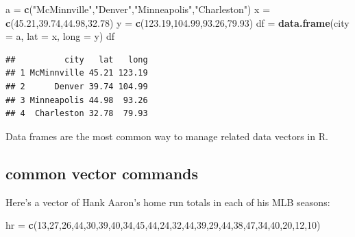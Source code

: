 \documentclass[
]{book}
\newenvironment{Shaded}{\begin{snugshade}}{\end{snugshade}}
\newcommand{\AttributeTok}[1]{\textcolor[rgb]{0.13,0.29,0.53}{#1}}
\newcommand{\DecValTok}[1]{\textcolor[rgb]{0.00,0.00,0.81}{#1}}
\newcommand{\FloatTok}[1]{\textcolor[rgb]{0.00,0.00,0.81}{#1}}
\newcommand{\FunctionTok}[1]{\textcolor[rgb]{0.13,0.29,0.53}{\textbf{#1}}}
\newcommand{\NormalTok}[1]{#1}
\newcommand{\OtherTok}[1]{\textcolor[rgb]{0.56,0.35,0.01}{#1}}
\newcommand{\StringTok}[1]{\textcolor[rgb]{0.31,0.60,0.02}{#1}}
\theoremstyle{definition}
\theoremstyle{definition}
\theoremstyle{definition}
\theoremstyle{definition}
\theoremstyle{remark}
\begin{document}
\begin{Shaded}
\begin{Highlighting}[]
\NormalTok{a }\OtherTok{=} \FunctionTok{c}\NormalTok{(}\StringTok{"McMinnville"}\NormalTok{,}\StringTok{"Denver"}\NormalTok{,}\StringTok{"Minneapolis"}\NormalTok{,}\StringTok{"Charleston"}\NormalTok{)}
\NormalTok{x }\OtherTok{=} \FunctionTok{c}\NormalTok{(}\FloatTok{45.21}\NormalTok{,}\FloatTok{39.74}\NormalTok{,}\FloatTok{44.98}\NormalTok{,}\FloatTok{32.78}\NormalTok{)}
\NormalTok{y }\OtherTok{=} \FunctionTok{c}\NormalTok{(}\FloatTok{123.19}\NormalTok{,}\FloatTok{104.99}\NormalTok{,}\FloatTok{93.26}\NormalTok{,}\FloatTok{79.93}\NormalTok{)}
\NormalTok{df }\OtherTok{=} \FunctionTok{data.frame}\NormalTok{(}\AttributeTok{city =}\NormalTok{ a, }\AttributeTok{lat =}\NormalTok{ x, }\AttributeTok{long =}\NormalTok{ y)}
\NormalTok{df}
\end{Highlighting}
\end{Shaded}

\begin{verbatim}
##          city   lat   long
## 1 McMinnville 45.21 123.19
## 2      Denver 39.74 104.99
## 3 Minneapolis 44.98  93.26
## 4  Charleston 32.78  79.93
\end{verbatim}

Data frames are the most common way to manage related data vectors in R.

\subsection*{common vector commands}\label{common-vector-commands}

Here's a vector of Hank Aaron's home run totals in each of his MLB seasons:

\begin{Shaded}
\begin{Highlighting}[]
\NormalTok{hr }\OtherTok{=} \FunctionTok{c}\NormalTok{(}\DecValTok{13}\NormalTok{,}\DecValTok{27}\NormalTok{,}\DecValTok{26}\NormalTok{,}\DecValTok{44}\NormalTok{,}\DecValTok{30}\NormalTok{,}\DecValTok{39}\NormalTok{,}\DecValTok{40}\NormalTok{,}\DecValTok{34}\NormalTok{,}\DecValTok{45}\NormalTok{,}\DecValTok{44}\NormalTok{,}\DecValTok{24}\NormalTok{,}\DecValTok{32}\NormalTok{,}\DecValTok{44}\NormalTok{,}\DecValTok{39}\NormalTok{,}\DecValTok{29}\NormalTok{,}\DecValTok{44}\NormalTok{,}\DecValTok{38}\NormalTok{,}\DecValTok{47}\NormalTok{,}\DecValTok{34}\NormalTok{,}\DecValTok{40}\NormalTok{,}\DecValTok{20}\NormalTok{,}\DecValTok{12}\NormalTok{,}\DecValTok{10}\NormalTok{)}
\end{Highlighting}
\end{Shaded}
\end{document}
